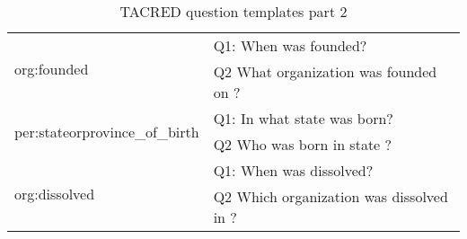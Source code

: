 \documentclass[11pt]{article}
\begin{document}
\begin{table*}[]
{\begin{tabular}{|l|l|}
\multirow{2}{*}{ org:founded } & Q1:  When was  founded?                 \\
               & Q2 What organization was founded on ?                 \\ \hline
\multirow{2}{*}{ per:stateorprovince\_of\_birth } & Q1:  In what state was  born?                 \\
               & Q2 Who was born in state ?                 \\ \hline
\multirow{2}{*}{ org:dissolved } & Q1:  When was  dissolved?                 \\
               & Q2 Which organization was dissolved in ?                 \\ \hline
\end{tabular}}
\caption{TACRED question templates part 2}
\label{tbl:tmp2}
\end{table*}
\end{document}
